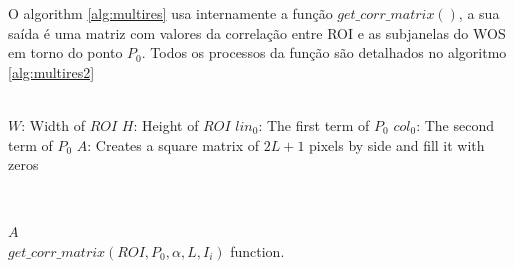 O algorithm \ref{alg:multires} usa internamente a função $get\_corr\_matrix()$,
a sua saída é uma matriz com valores da correlação entre ROI e as subjanelas do WOS
em torno do ponto $P_0$. Todos os processos da função são detalhados no algoritmo
\ref{alg:multires2}


\begin{algorithm}
 ~\\
 $W$: Width of $ROI$\;
 $H$: Height of $ROI$\;
 $lin_0$: The first term of $P_0$\;
 $col_0$: The second term of $P_0$\;
 $A$: Creates a square matrix of $2L+1$ pixels by side and fill it with zeros\;

 ~\\
    
\Return $A$\;
~\\
\caption{$get\_corr\_matrix(ROI,P_0,\alpha,L,I_i)$ function.}
\label{alg:multires2}
\end{algorithm}

